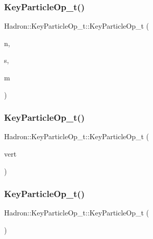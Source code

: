 \subsubsection{\texorpdfstring{KeyParticleOp\_t()}{KeyParticleOp\_t()}\hspace{0.1cm}{\footnotesize\ttfamily [2/6]}}
{\footnotesize\ttfamily Hadron\+::\+Key\+Particle\+Op\+\_\+t\+::\+Key\+Particle\+Op\+\_\+t (\begin{DoxyParamCaption}\item[{const std\+::string \&}]{n,  }\item[{const std\+::string \&}]{s,  }\item[{const \mbox{\hyperlink{classXMLArray_1_1Array}{Array}}$<$ int $>$ \&}]{m }\end{DoxyParamCaption})\hspace{0.3cm}{\ttfamily [inline]}}

\mbox{\label{structHadron_1_1KeyParticleOp__t_a11187f2c592a8404deba8a067432275e}} 
\subsubsection{\texorpdfstring{KeyParticleOp\_t()}{KeyParticleOp\_t()}\hspace{0.1cm}{\footnotesize\ttfamily [3/6]}}
{\footnotesize\ttfamily Hadron\+::\+Key\+Particle\+Op\+\_\+t\+::\+Key\+Particle\+Op\+\_\+t (\begin{DoxyParamCaption}\item[{const \mbox{\hyperlink{structHadron_1_1HadronVertex__t}{Hadron\+Vertex\+\_\+t}} \&}]{vert }\end{DoxyParamCaption})}

\mbox{\label{structHadron_1_1KeyParticleOp__t_aeb83d38886aa274e5e579d1828529809}} 
\subsubsection{\texorpdfstring{KeyParticleOp\_t()}{KeyParticleOp\_t()}\hspace{0.1cm}{\footnotesize\ttfamily [4/6]}}
{\footnotesize\ttfamily Hadron\+::\+Key\+Particle\+Op\+\_\+t\+::\+Key\+Particle\+Op\+\_\+t (\begin{DoxyParamCaption}{ }\end{DoxyParamCaption})\hspace{0.3cm}{\ttfamily [inline]}}

